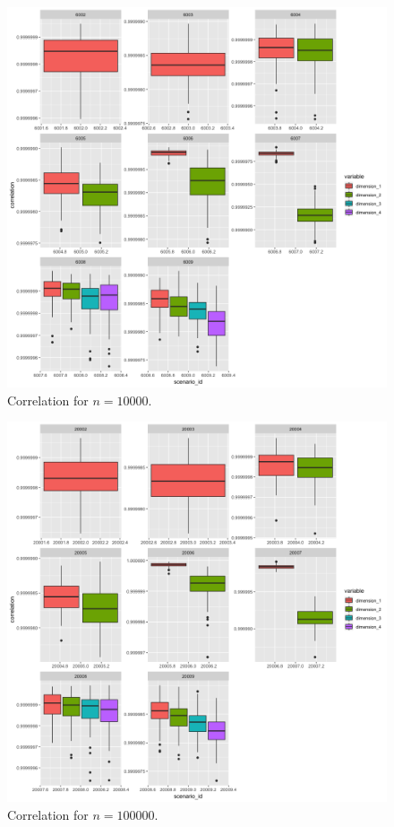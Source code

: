 \documentclass[11pt]{report}
\begin{document}
\begin{figure}[ht]
\centering
    \includegraphics[scale = 1.5]{./images/fast_correlation_10000.png}
    \caption{Correlation for $n = 10000$.}
    \label{fast_correlation_10000}
\end{figure}

\begin{figure}[ht]
\centering
    \includegraphics[scale = 1.5]{./images/fast_correlation_100000.png}
    \caption{Correlation for $n = 100000$.}
    \label{fast_correlation_100000}
\end{figure}
\end{document}

